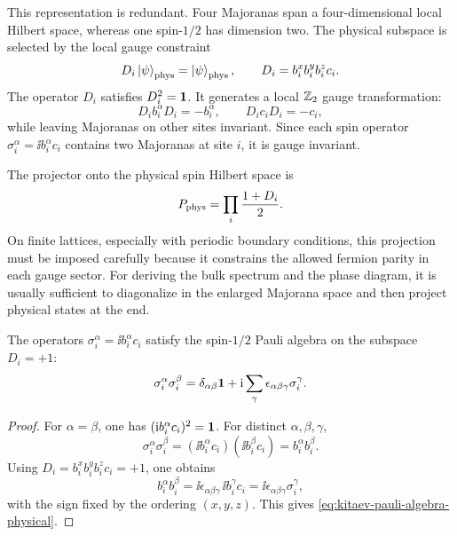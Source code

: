 This representation is redundant.  Four Majoranas span a four-dimensional local
Hilbert space, whereas one spin-\(1/2\) has dimension two.  The physical
subspace is selected by the local gauge constraint
\begin{equation}
\label{eq:kitaev-local-gauge-constraint}
    D_i\left|\psi\right\rangle_{\rm phys}=\left|\psi\right\rangle_{\rm phys},
    \qquad
    D_i=b_i^x b_i^y b_i^z c_i .
\end{equation}
The operator \(D_i\) satisfies \(D_i^2=\mathbf{1}\).  It generates a local
\(\mathbb{Z}_2\) gauge transformation:
\begin{equation}
\label{eq:kitaev-gauge-flip-majoranas}
    D_i b_i^\alpha D_i=-b_i^\alpha,
    \qquad
    D_i c_i D_i=-c_i,
\end{equation}
while leaving Majoranas on other sites invariant.  Since each spin operator
\(\sigma_i^\alpha=\ii b_i^\alpha c_i\) contains two Majoranas at site \(i\), it
is gauge invariant.

The projector onto the physical spin Hilbert space is
\begin{equation}
\label{eq:kitaev-physical-projector}
    P_{\rm phys}
    =
    \prod_i \frac{1+D_i}{2} .
\end{equation}
On finite lattices, especially with periodic boundary conditions, this projection
must be imposed carefully because it constrains the allowed fermion parity in
each gauge sector.  For deriving the bulk spectrum and the phase diagram, it is
usually sufficient to diagonalize in the enlarged Majorana space and then project
physical states at the end.

\begin{proposition}
The operators \(\sigma_i^\alpha=\ii b_i^\alpha c_i\) satisfy the spin-\(1/2\)
Pauli algebra on the subspace \(D_i=+1\):
\begin{equation}
\label{eq:kitaev-pauli-algebra-physical}
    \sigma_i^\alpha\sigma_i^\beta
    =
    \delta_{\alpha\beta}\mathbf{1}
    +\mathrm{i}\sum_{\gamma}\epsilon_{\alpha\beta\gamma}\sigma_i^\gamma .
\end{equation}
\end{proposition}

\begin{proof}
For \(\alpha=\beta\), one has
\((\mathrm{i} b_i^\alpha c_i)^2=\mathbf{1}\).  For distinct \(\alpha,\beta,\gamma\),
\begin{equation}
\label{eq:kitaev-pauli-proof-product}
    \sigma_i^\alpha\sigma_i^\beta
    =
    (\ii b_i^\alpha c_i)(\ii b_i^\beta c_i)
    =
    b_i^\alpha b_i^\beta .
\end{equation}
Using \(D_i=b_i^x b_i^y b_i^z c_i=+1\), one obtains
\begin{equation}
\label{eq:kitaev-pauli-proof-constraint-use}
    b_i^\alpha b_i^\beta
    =
    \ii\epsilon_{\alpha\beta\gamma}\,\ii b_i^\gamma c_i
    =
    \ii\epsilon_{\alpha\beta\gamma}\sigma_i^\gamma,
\end{equation}
with the sign fixed by the ordering \((x,y,z)\).  This gives
\cref{eq:kitaev-pauli-algebra-physical}.
\end{proof}

